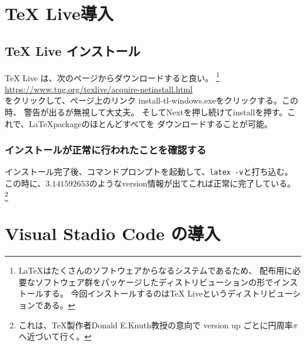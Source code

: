 \documentclass{ltjsarticle}
\begin{document}
\section{TeX Live導入}

\subsection{TeX Live インストール}
TeX Live は、次のページからダウンロードすると良い。
\footnote{
  \LaTeX はたくさんのソフトウェアからなるシステムであるため、
  配布用に必要なソフトウェア群をパッケージしたディストリビューションの形でインストールする。
  今回インストールするのはTeX Liveというディストリビューションである。
}
\\
\url{https://www.tug.org/texlive/acquire-netinstall.html}\\
をクリックして、ページ上のリンク install-tl-windows.exeをクリックする。この時、
警告が出るが無視して大丈夫。
そしてNextを押し続けてinstallを押す。これで、\LaTeX packageのほとんどすべてを
ダウンロードすることが可能。

\subsubsection*{インストールが正常に行われたことを確認する}
インストール完了後、コマンドプロンプトを起動して、\verb|latex -v|と打ち込む。
この時に、$3.141592653$のようなversion情報が出てこれば正常に完了している。
\footnote{
  これは、\TeX 製作者Donald E.Knuth教授の意向で
  version up ごとに円周率$\pi$へ近づいて行く。
}

\section{Visual Stadio Code の導入}
\end{document}
